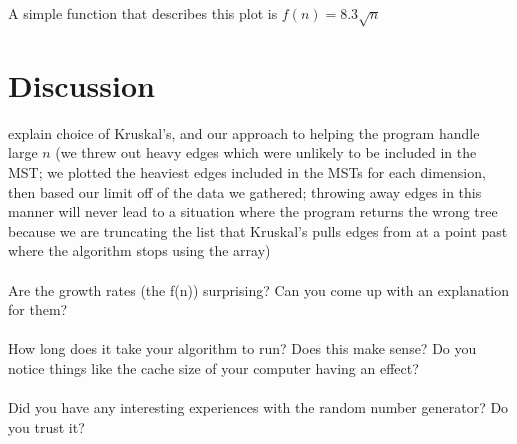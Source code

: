 \documentclass[solution, letterpaper]{cs121}
\begin{document}
A simple function that describes this plot is $f(n) = 8.3 \sqrt{n}$
\pagebreak
\section*{Discussion}

explain choice of Kruskal's, and our approach to helping the program handle large $n$ (we threw out heavy edges which were unlikely to be included in the MST; we plotted the heaviest edges included in the MSTs for each dimension, then based our limit off of the data we gathered; throwing away edges in this manner will never lead to a situation where the program returns the wrong tree because we are truncating the list that Kruskal's pulls edges from at a point past where the algorithm stops using the array)\\ \\
Are the growth rates (the f(n)) surprising? Can you come up with an explanation for them? \\ \\
How long does it take your algorithm to run? Does this make sense? Do you notice things like the cache size of your computer having an effect? \\ \\
Did you have any interesting experiences with the random number generator? Do you trust it? \\ \\
\end{document}
